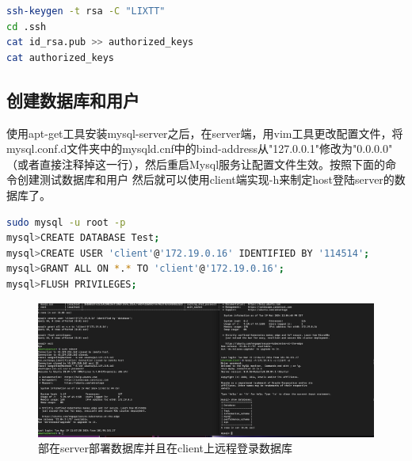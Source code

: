 \documentclass{article}
\begin{document}
\begin{lstlisting}[language=bash]
ssh-keygen -t rsa -C "LIXTT"
cd .ssh
cat id_rsa.pub >> authorized_keys
cat authorized_keys
\end{lstlisting}

\subsection{创建数据库和用户}

使用apt-get工具安装mysql-server之后，在server端，用vim工具更改配置文件，将mysql.conf.d文件夹中的mysqld.cnf中的bind-address从"127.0.0.1"修改为"0.0.0.0"
（或者直接注释掉这一行），然后重启Mysql服务让配置文件生效。按照下面的命令创建测试数据库和用户
然后就可以使用client端实现-h来制定host登陆server的数据库了。
\begin{lstlisting}[language=bash]
sudo mysql -u root -p
mysql>CREATE DATABASE Test;
mysql>CREATE USER 'client'@'172.19.0.16' IDENTIFIED BY '114514';
mysql>GRANT ALL ON *.* TO 'client'@'172.19.0.16';
mysql>FLUSH PRIVILEGES;
\end{lstlisting}
\begin{figure}
    \centering
    \includegraphics[width=1.0\textwidth]{deploy_mysql.png}
    \caption{部在server部署数据库并且在client上远程登录数据库}
\end{figure}
\end{document}
